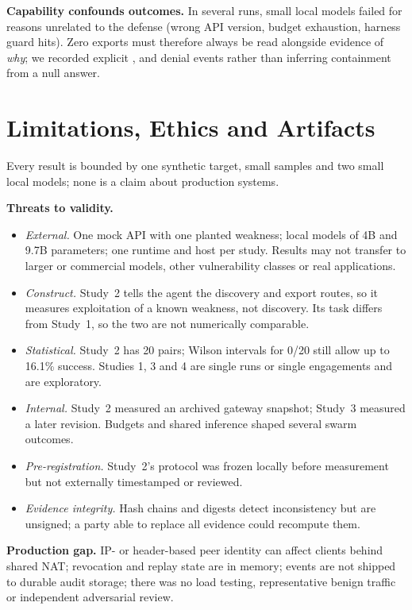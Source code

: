 \documentclass[conference]{IEEEtran}
\newcommand{\code}[1]{\path{#1}}
\begin{document}
\textbf{Capability confounds outcomes.} In several runs, small local models failed for reasons unrelated to the defense (wrong API version, budget exhaustion, harness guard hits). Zero exports must therefore always be read alongside evidence of \emph{why}; we recorded explicit \code{canary.used}, \code{defense.revoked} and denial events rather than inferring containment from a null answer.

\section{Limitations, Ethics and Artifacts}
\label{sec:limits}
Every result is bounded by one synthetic target, small samples and two small local models; none is a claim about production systems.

\textbf{Threats to validity.}
\begin{itemize}
\item \emph{External.} One mock API with one planted weakness; local models of 4B and 9.7B parameters; one runtime and host per study. Results may not transfer to larger or commercial models, other vulnerability classes or real applications.
\item \emph{Construct.} Study~2 tells the agent the discovery and export routes, so it measures exploitation of a known weakness, not discovery. Its task differs from Study~1, so the two are not numerically comparable.
\item \emph{Statistical.} Study~2 has 20 pairs; Wilson intervals for 0/20 still allow up to 16.1\% success. Studies 1, 3 and 4 are single runs or single engagements and are exploratory.
\item \emph{Internal.} Study~2 measured an archived gateway snapshot; Study~3 measured a later revision. Budgets and shared inference shaped several swarm outcomes.
\item \emph{Pre-registration.} Study~2's protocol was frozen locally before measurement but not externally timestamped or reviewed.
\item \emph{Evidence integrity.} Hash chains and digests detect inconsistency but are unsigned; a party able to replace all evidence could recompute them.
\end{itemize}

\textbf{Production gap.} IP- or header-based peer identity can affect clients behind shared NAT; revocation and replay state are in memory; events are not shipped to durable audit storage; there was no load testing, representative benign traffic or independent adversarial review.
\end{document}
